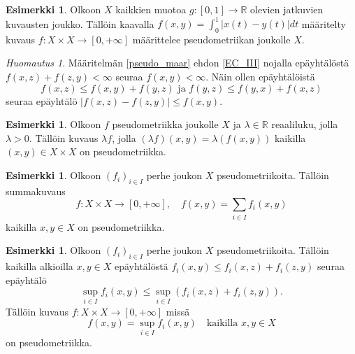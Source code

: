 \documentclass[12pt,a4paper,leqno]{report}
\newcommand{\R}{\mathbb{R}}
\theoremstyle{plain}
\theoremstyle{definition}
\newtheorem{esim}[equation]{Esimerkki}
\theoremstyle{remark}
\newtheorem{huom}[equation]{Huomautus}
\begin{document}
\begin{esim}%
Olkoon $X$ kaikkien muotoa $g\colon [0,1]\rightarrow \R$ olevien jatkuvien kuvausten joukko. %
Tällöin kaavalla $f(x,y)=\int_0^1 |x(t)-y(t)|dt$ määritelty kuvaus $f\colon X\times X\rightarrow [0,+\infty]$ määrittelee pseudometriikan joukolle $X$.
\end{esim}
\begin{huom}
Määritelmän \ref{pseudo_maar} ehdon \ref{EC_III} nojalla epäyhtälöstä $f(x,z)+f(z,y)<\infty$ seuraa $f(x,y)<\infty$. 
Näin ollen epäyhtälöistä 
\begin{equation*}
f(x,z)\leq f(x,y)+f(y,z)\text{ ja }f(y,z)\leq f(y,x)+f(x,z)
\end{equation*}
seuraa epäyhtälö $|f(x,z)-f(z,y)|\leq f(x,y)$.
\end{huom}
\begin{esim}%
Olkoon $f$ pseudometriikka joukolle $X$ ja 
$\lambda\in\R$ reaaliluku, jolla $\lambda >0$. 
Tällöin kuvaus $\lambda f$, jolla 
$(\lambda f) (x,y)=\lambda (f (x,y))$ 
kaikilla $(x,y)\in X\times X$ on pseudometriikka.
\end{esim}
\begin{esim}%
Olkoon $(f_i)_{i\in I}$ perhe joukon $X$ pseudometriikoita. 
Tällöin summakuvaus 
\begin{equation*}
f\colon X\times X\rightarrow [0,+\infty],\quad
f(x,y)=\sum_{i\in I}f_i(x,y)%
\end{equation*} 
kaikilla $x,y\in X$ 
on pseudometriikka.
\end{esim}
\begin{esim}%
\label{pseudometriikkaperheen sup}
Olkoon $(f_i)_{i\in I}$ perhe joukon $X$ pseudometriikoita. 
Tällöin kaikilla alkioilla $x,y\in X$ epäyhtälöstä 
$f_i(x,y)\leq f_i(x,z)+f_i(z,y)$ seuraa epäyhtälö 
$$\sup_{i\in I}f_i(x,y)\leq \sup_{i\in I}\left(f_i(x,z)+f_i(z,y)\right).$$
Tällöin kuvaus 
$f\colon X\times X\rightarrow [0,+\infty]$
 missä  
\begin{equation*}
f(x,y)=\sup_{i\in I}f_i(x,y)
\quad\text{kaikilla }x,y\in X 
\end{equation*} 
on pseudometriikka. 
\end{esim}
\end{document}
